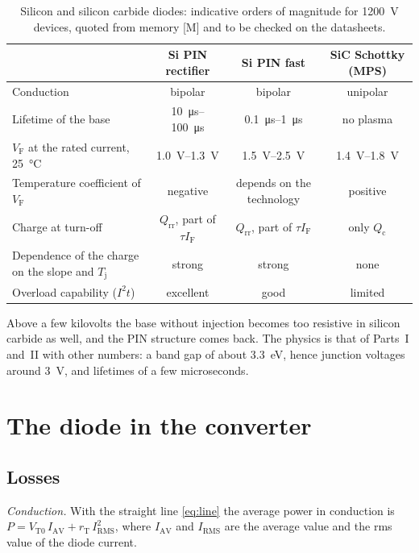\documentclass[10pt,a4paper]{scrartcl}
\newcommand{\IF}{I_\mathrm{F}}
\newcommand{\VF}{V_\mathrm{F}}
\newcommand{\Qrr}{Q_\mathrm{rr}}
\newcommand{\VTo}{V_\mathrm{T0}}
\newcommand{\rT}{r_\mathrm{T}}
\newcommand{\Tj}{T_\mathrm{j}}
\begin{document}
\begin{table}[htb]
\centering\small
\caption{Silicon and silicon carbide diodes: indicative orders of magnitude for \SI{1200}{\volt} devices, quoted from memory [M] and to be checked on the datasheets.}
\label{tab:sic}
\begin{tabular}{@{}lccc@{}}
\toprule
 & Si PIN rectifier & Si PIN fast & SiC Schottky (MPS) \\
\midrule
Conduction & bipolar & bipolar & unipolar \\
Lifetime of the base & \SIrange{10}{100}{\micro\second} & \SIrange{0.1}{1}{\micro\second} & no plasma \\
$\VF$ at the rated current, \SI{25}{\celsius} & \SIrange{1.0}{1.3}{\volt} & \SIrange{1.5}{2.5}{\volt} & \SIrange{1.4}{1.8}{\volt} \\
Temperature coefficient of $\VF$ & negative & depends on the technology & positive \\
Charge at turn-off & $\Qrr$, part of $\tau\IF$ & $\Qrr$, part of $\tau\IF$ & only $Q_\mathrm{c}$ \\
Dependence of the charge on the slope and $\Tj$ & strong & strong & none \\
Overload capability ($I^2t$) & excellent & good & limited \\
\bottomrule
\end{tabular}
\end{table}

Above a few kilovolts the base without injection becomes too resistive in silicon carbide as well, and the PIN structure comes back. The physics is that of Parts~I and~II with other numbers: a band gap of about \SI{3.3}{\electronvolt}, hence junction voltages around \SI{3}{\volt}, and lifetimes of a few microseconds.

\section{The diode in the converter}
\label{sec:converter}
\subsection{Losses}
\label{sec:losses}
\emph{Conduction.} With the straight line \eqref{eq:line} the average power in conduction is $P = \VTo\,I_\mathrm{AV} + \rT\,I_\mathrm{RMS}^2$, where $I_\mathrm{AV}$ and $I_\mathrm{RMS}$ are the average value and the rms value of the diode current.
\end{document}
